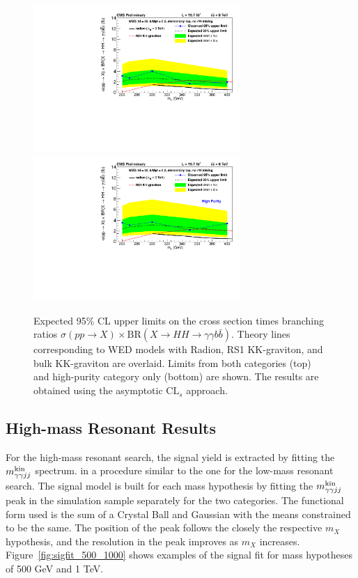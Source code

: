 \begin{figure}[ht]
 \begin{center}
   \includegraphics[width=0.7\textwidth]{figures/results/WP4_cutbased_low_all.pdf}
   \includegraphics[width=0.7\textwidth]{figures/results/WP4_cutbased_low_base_onecat.pdf}
 \end{center}
\caption{Expected 95\% CL upper limits on the cross section times branching ratios
$\sigma(pp\rightarrow X) \times \text{BR}( X \rightarrow HH \rightarrow \gamma\gamma b\bar{b})$.
Theory lines corresponding to WED models with Radion, RS1 KK-graviton, and bulk KK-graviton are
overlaid. Limits from both categories (top) and high-purity category only (bottom) are shown.
The results are obtained using the asymptotic $\text{CL}_s$ approach.}
\label{fig:limits_lowmassres}
\end{figure}

\subsection{High-mass Resonant Results}

For the high-mass resonant search, the signal yield is extracted by fitting the $m_{\gamma\gamma jj}^{\rm kin}$ spectrum.
in a procedure similar to the one for the low-mass resonant search. The signal model is built
for each mass hypothesis by fitting the $m_{\gamma\gamma jj}^{\rm kin}$ peak in the simulation sample separately for the
two categories. The functional form used is the sum of a Crystal Ball and Gaussian with the means
constrained to be the same. The position of the peak follows the closely the respective $m_X$
hypothesis,
and the resolution in the peak improves as $m_X$ increases. Figure~\ref{fig:sigfit_500_1000}
shows examples of the signal fit for mass hypotheses of 500 GeV and 1 TeV.

